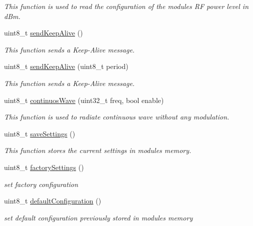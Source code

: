 \begin{DoxyCompactItemize}
\begin{DoxyCompactList}\small\item\em This function is used to read the configuration of the module\textquotesingle{}s RF power level in d\+Bm. \end{DoxyCompactList}\item 
uint8\+\_\+t \hyperlink{class_wasp_sigfox_adc1b4ec26bbefe815352e3ae5cf8444a}{send\+Keep\+Alive} ()
\begin{DoxyCompactList}\small\item\em This function sends a Keep-\/\+Alive message. \end{DoxyCompactList}\item 
uint8\+\_\+t \hyperlink{class_wasp_sigfox_aa3c81e47a585929117befdb41db965a4}{send\+Keep\+Alive} (uint8\+\_\+t period)
\begin{DoxyCompactList}\small\item\em This function sends a Keep-\/\+Alive message. \end{DoxyCompactList}\item 
uint8\+\_\+t \hyperlink{class_wasp_sigfox_a7bce20b6947e9e00eea9d88a0dae9191}{continuos\+Wave} (uint32\+\_\+t freq, bool enable)
\begin{DoxyCompactList}\small\item\em This function is used to radiate continuous wave without any modulation. \end{DoxyCompactList}\item 
uint8\+\_\+t \hyperlink{class_wasp_sigfox_a944d6d4c0325663cee0a14d63346ca59}{save\+Settings} ()
\begin{DoxyCompactList}\small\item\em This function stores the current settings in module\textquotesingle{}s memory. \end{DoxyCompactList}\item 
uint8\+\_\+t \hyperlink{class_wasp_sigfox_a7cca655a5954b01c824ab2f8c3df36e4}{factory\+Settings} ()
\begin{DoxyCompactList}\small\item\em set factory configuration \end{DoxyCompactList}\item 
uint8\+\_\+t \hyperlink{class_wasp_sigfox_a3fe86a506ad8d8d629a02d13c3961ceb}{default\+Configuration} ()
\begin{DoxyCompactList}\small\item\em set default configuration previously stored in module\textquotesingle{}s memory \end{DoxyCompactList}\item 

\end{DoxyCompactItemize}
